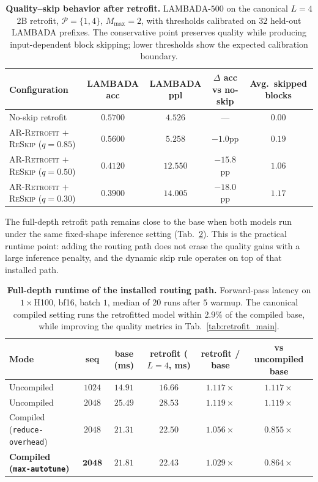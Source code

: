 \documentclass{article}
\newcommand{\reskip}{\textsc{ReSkip}}
\newcommand{\retrofit}{\textsc{AR-Retrofit}}
\begin{document}
\begin{table}[t]
\caption{\textbf{Quality--skip behavior after retrofit.} LAMBADA-$500$ on the canonical $L{=}4$ 2B retrofit, $\mathcal{P}{=}\{1,4\}$, $M_{\max}{=}2$, with thresholds calibrated on $32$ held-out LAMBADA prefixes. The conservative point preserves quality while producing input-dependent block skipping; lower thresholds show the expected calibration boundary.}
\label{tab:retrofit_reskip_main}
\centering\small
\setlength{\tabcolsep}{4pt}
\begin{tabular}{lcccc}
\toprule
Configuration & LAMBADA acc & LAMBADA ppl & $\Delta$ acc vs no-skip & Avg.\ skipped blocks \\
\midrule
No-skip retrofit & $0.5700$ & $4.526$ & --- & $0.00$ \\
\retrofit{} $+$ \reskip{} ($q{=}0.85$) & $0.5600$ & $5.258$ & $-1.0$pp & $0.19$ \\
\retrofit{} $+$ \reskip{} ($q{=}0.50$) & $0.4120$ & $12.550$ & $-15.8$pp & $1.06$ \\
\retrofit{} $+$ \reskip{} ($q{=}0.30$) & $0.3900$ & $14.005$ & $-18.0$pp & $1.17$ \\
\bottomrule
\end{tabular}
\end{table}

The full-depth retrofit path remains close to the base when both models run under the same fixed-shape inference setting (Tab.~\ref{tab:retrofit_latency}). This is the practical runtime point: adding the routing path does not erase the quality gains with a large inference penalty, and the dynamic skip rule operates on top of that installed path.

\begin{table}[t]
\caption{\textbf{Full-depth runtime of the installed routing path.} Forward-pass latency on $1{\times}$H100, bf16, batch $1$, median of $20$ runs after $5$ warmup. The canonical compiled setting runs the retrofitted model within $2.9\%$ of the compiled base, while improving the quality metrics in Tab.~\ref{tab:retrofit_main}.}
\label{tab:retrofit_latency}
\centering\small
\setlength{\tabcolsep}{4pt}
\begin{tabular}{lccccc}
\toprule
Mode & seq & base (ms) & retrofit ($L{=}4$, ms) & retrofit / base & vs uncompiled base \\
\midrule
Uncompiled                                & $1024$ & $14.91$ & $16.66$ & $1.117\times$ & $1.117\times$ \\
Uncompiled                                & $2048$ & $25.49$ & $28.53$ & $1.119\times$ & $1.119\times$ \\
Compiled (\texttt{reduce-overhead})       & $2048$ & $21.31$ & $22.50$ & $1.056\times$ & $0.855\times$ \\
\textbf{Compiled (\texttt{max-autotune})} & $\mathbf{2048}$ & $\mathbf{21.81}$ & $\mathbf{22.43}$ & $\mathbf{1.029\times}$ & $\mathbf{0.864\times}$ \\
\bottomrule
\end{tabular}
\end{table}
\end{document}
